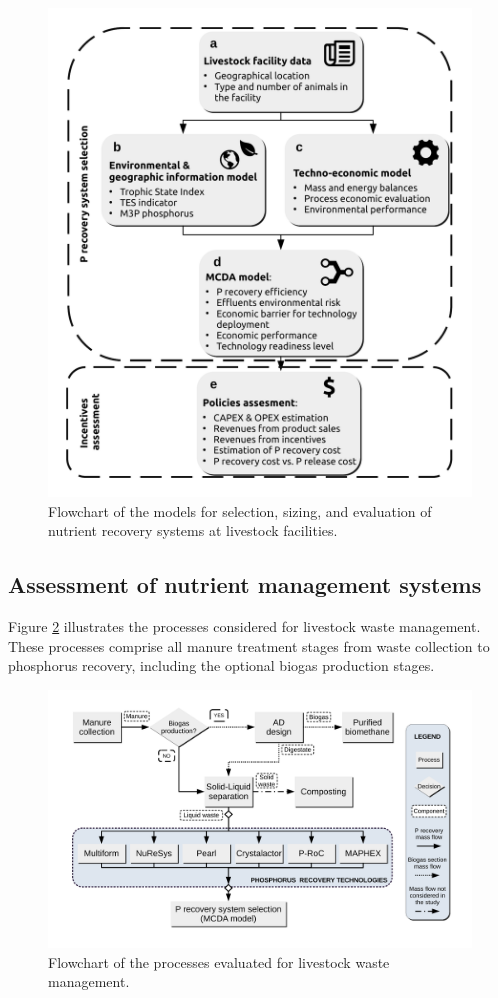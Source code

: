 \begin{refsection}[referencesCh5]
\begin{figure}[h]
	\centering
	\includegraphics[width=0.85\linewidth, trim={1cm 1cm 1cm 1cm},clip]{gfx/Chapter5/tool_diagram_v4color} 
	\caption{Flowchart of the models for selection, sizing, and evaluation of nutrient recovery systems at livestock facilities.}
	\label{fig:tool_diagram}
\end{figure}

\subsection{Assessment of nutrient management systems}
Figure \ref{fig:techs_diagrams} illustrates the processes considered for livestock waste management. These processes comprise all manure treatment stages from waste collection to phosphorus recovery, including the optional biogas production stages.

\begin{figure}[h]
	\centering
	\includegraphics[width=1\linewidth, trim={1.5cm 1.5cm 1.5cm 1.5cm},clip]{gfx/Chapter5/Process_Flowsheet.pdf} 
	\caption{Flowchart of the processes evaluated for livestock waste management.}
	\label{fig:techs_diagrams}
\end{figure}


\end{refsection}
